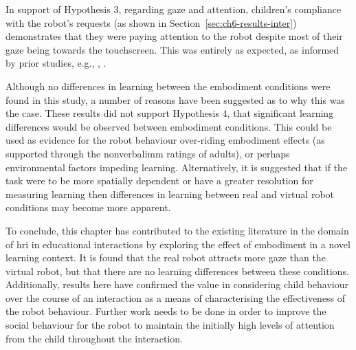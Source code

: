 In support of Hypothesis 3, regarding gaze and attention, children's compliance with the robot's requests (as shown in Section~\ref{sec:ch6-results-inter}) demonstrates that they were paying attention to the robot despite most of their gaze being towards the touchscreen. This was entirely as expected, as informed by prior studies, e.g., \cite{baxter2012touchscreen}, \cite{kennedy2013constraining}.

Although no differences in learning between the embodiment conditions were found in this study, a number of reasons have been suggested as to why this was the case. These results did not support Hypothesis 4, that significant learning differences would be observed between embodiment conditions. This could be used as evidence for the robot behaviour over-riding embodiment effects (as supported through the \gls{nonverbalimm} ratings of adults), or perhaps environmental factors impeding learning. Alternatively, it is suggested that if the task were to be more spatially dependent or have a greater resolution for measuring learning then differences in learning between real and virtual robot conditions may become more apparent.

To conclude, this chapter has contributed to the existing literature in the domain of \acrshort{hri} in educational interactions by exploring the effect of embodiment in a novel learning context. It is found that the real robot attracts more gaze than the virtual robot, but that there are no learning differences between these conditions. Additionally, results here have confirmed the value in considering child behaviour over the course of an interaction as a means of characterising the effectiveness of the robot behaviour. Further work needs to be done in order to improve the social behaviour for the robot to maintain the initially high levels of attention from the child throughout the interaction.